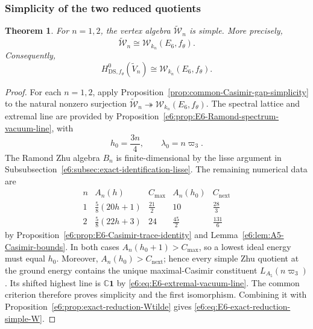 \documentclass[11pt,reqno]{amsart}
\newtheorem{theorem}{Theorem}[section]
\theoremstyle{definition}
\theoremstyle{remark}
\begin{document}
\subsubsection{Simplicity of the two reduced quotients}


\begin{theorem}\label{e6:thm:E6-Wtilde-simple}
For $n=1,2$, the vertex algebra $\widetilde{\mathcal W}_n$ is simple.  More
precisely,
\begin{equation*}
  \widetilde{\mathcal W}_n
  \cong
  \mathcal W_{k_n}(E_6,f_\theta).
\end{equation*}
Consequently,
\begin{equation}\label{e6:eq:E6-exact-reduction-simple-W}
  H^0_{\mathrm{DS},f_\theta}(\widetilde V_n)
  \cong
  \mathcal W_{k_n}(E_6,f_\theta).
\end{equation}
\end{theorem}

\begin{proof}
For each $n=1,2$, apply
Proposition~\ref{prop:common-Casimir-gap-simplicity} to the natural nonzero
surjection
$\widetilde{\mathcal W}_n\twoheadrightarrow
\mathcal W_{k_n}(E_6,f_\theta)$.  The spectral lattice and extremal line are
provided by Proposition~\ref{e6:prop:E6-Ramond-spectrum-vacuum-line}, with
\[
 h_0=\frac{3n}{4},
 \qquad
 \lambda_0=n\varpi_3.
\]
The Ramond Zhu algebra $B_n$ is finite-dimensional by the lisse argument in
Subsubsection~\ref{e6:subsec:exact-identification-lisse}.  The remaining numerical data
are
\[
\begin{array}{c|c|c|c|c}
 n&A_n(h)&C_{\max}&A_n(h_0)&C_{\mathrm{next}}\\ \hline
 1&\frac58(20h+1)&\frac{21}{2}&10&\frac{28}{3}\\[1mm]
 2&\frac58(22h+3)&24&\frac{45}{2}&\frac{131}{6}
\end{array}
\]
by Proposition~\ref{e6:prop:E6-Casimir-trace-identity} and
Lemma~\ref{e6:lem:A5-Casimir-bounds}.  In both cases
$A_n(h_0+1)>C_{\max}$, so a lowest ideal energy must equal $h_0$.
Moreover, $A_n(h_0)>C_{\mathrm{next}}$; hence every simple Zhu quotient at
the ground energy contains the unique maximal-Casimir constituent
$L_{A_5}(n\varpi_3)$.  Its shifted highest line is
$\mathbb C\mathbf1$ by
\eqref{e6:eq:E6-extremal-vacuum-line}.  The common criterion therefore
proves simplicity and the first isomorphism.  Combining it with
Proposition~\ref{e6:prop:exact-reduction-Wtilde} gives
\eqref{e6:eq:E6-exact-reduction-simple-W}.
\end{proof}
\end{document}
